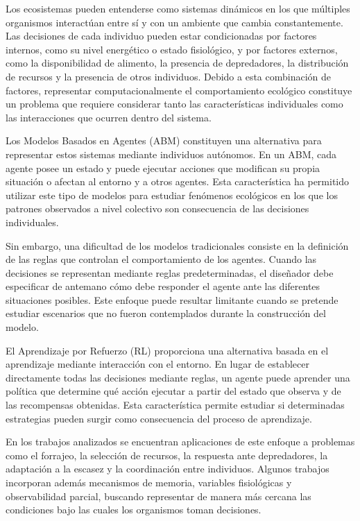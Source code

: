 \documentclass[conference]{IEEEtran}
\begin{document}
Los ecosistemas pueden entenderse como sistemas dinámicos en los que
múltiples organismos interactúan entre sí y con un ambiente que cambia
constantemente. Las decisiones de cada individuo pueden estar
condicionadas por factores internos, como su nivel energético o estado
fisiológico, y por factores externos, como la disponibilidad de alimento,
la presencia de depredadores, la distribución de recursos y la presencia
de otros individuos. Debido a esta combinación de factores, representar
computacionalmente el comportamiento ecológico constituye un problema que
requiere considerar tanto las características individuales como las
interacciones que ocurren dentro del sistema.

Los Modelos Basados en Agentes (ABM) constituyen una alternativa para
representar estos sistemas mediante individuos autónomos. En un ABM, cada
agente posee un estado y puede ejecutar acciones que modifican su propia
situación o afectan al entorno y a otros agentes. Esta característica ha
permitido utilizar este tipo de modelos para estudiar fenómenos
ecológicos en los que los patrones observados a nivel colectivo son
consecuencia de las decisiones individuales.

Sin embargo, una dificultad de los modelos tradicionales consiste en la
definición de las reglas que controlan el comportamiento de los agentes.
Cuando las decisiones se representan mediante reglas predeterminadas, el
diseñador debe especificar de antemano cómo debe responder el agente ante
las diferentes situaciones posibles. Este enfoque puede resultar
limitante cuando se pretende estudiar escenarios que no fueron
contemplados durante la construcción del modelo.

El Aprendizaje por Refuerzo (RL) proporciona una alternativa basada en el
aprendizaje mediante interacción con el entorno. En lugar de establecer
directamente todas las decisiones mediante reglas, un agente puede
aprender una política que determine qué acción ejecutar a partir del
estado que observa y de las recompensas obtenidas. Esta característica
permite estudiar si determinadas estrategias pueden surgir como
consecuencia del proceso de aprendizaje.

En los trabajos analizados se encuentran aplicaciones de este enfoque a
problemas como el forrajeo, la selección de recursos, la respuesta ante
depredadores, la adaptación a la escasez y la coordinación entre
individuos. Algunos trabajos incorporan además mecanismos de memoria,
variables fisiológicas y observabilidad parcial, buscando representar de
manera más cercana las condiciones bajo las cuales los organismos toman
decisiones.
\end{document}
